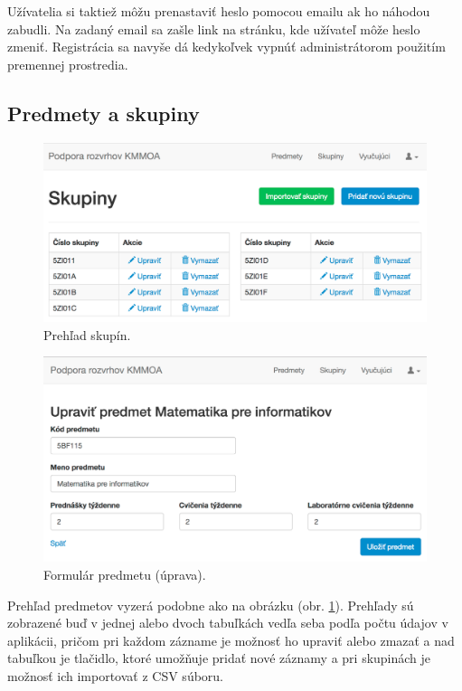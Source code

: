 Užívatelia si taktiež môžu prenastaviť heslo pomocou emailu ak ho náhodou zabudli. Na zadaný email sa zašle link na stránku, kde užívateľ môže heslo zmeniť. Registrácia sa navyše dá kedykoľvek vypnúť administrátorom použitím premennej prostredia.

\clearpage
\subsection{Predmety a skupiny}

\begin{figure}[!htb]
  \centering
  \includegraphics[width=1\textwidth]{content/images/ui/groups}
  \caption{Prehľad skupín.}
  \label{fig:groups}
\end{figure}

\begin{figure}[!htb]
  \centering
  \includegraphics[width=1\textwidth]{content/images/ui/course_edit}
  \caption{Formulár predmetu (úprava).}
  \label{fig:courses}
\end{figure}

\clearpage
Prehľad predmetov vyzerá podobne ako na obrázku (obr. \ref{fig:groups}). Prehľady sú zobrazené buď v jednej alebo dvoch tabuľkách vedľa seba podľa počtu údajov v aplikácii, pričom pri každom zázname je možnosť ho upraviť alebo zmazať a nad tabuľkou je tlačidlo, ktoré umožňuje pridať nové záznamy a pri skupinách je možnosť ich importovať z CSV súboru. 


